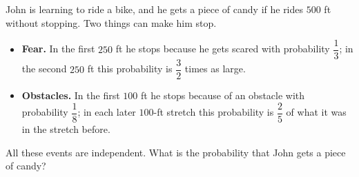 John is learning to ride a bike, and he gets a piece of candy if he rides $500$ ft without stopping. Two things can make him stop.
\begin{itemize}
\item \textbf{Fear.} In the first $250$ ft he stops because he gets scared with probability $\dfrac{1}{3}$; in the second $250$ ft this probability is $\dfrac{3}{2}$ times as large.
\item \textbf{Obstacles.} In the first $100$ ft he stops because of an obstacle with probability $\dfrac{1}{8}$; in each later $100$-ft stretch this probability is $\dfrac{2}{5}$ of what it was in the stretch before.
\end{itemize}
All these events are independent. What is the probability that John gets a piece of candy?
